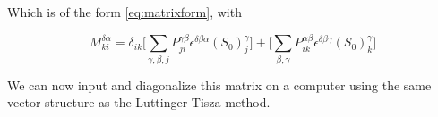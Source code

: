 \documentclass{article}
\begin{document}
Which is of the form \eqref{eq:matrixform}, with 

\begin{equation}
    M_{ki}^{\delta\alpha} = \delta_{ik}\big[\sum_{\gamma, \beta,j}P_{ji}^{\gamma \beta}\epsilon^{\delta \beta \alpha}(S_0)_j^{\gamma}\big] + \big[ \sum_{\beta,\gamma}P_{ik}^{\alpha \beta}\epsilon^{\delta \beta \gamma}(S_0)_k^{\gamma}\big]
\end{equation}

We can now input and diagonalize this matrix on a computer using the same vector structure as the Luttinger-Tisza method.\\
\end{document}
